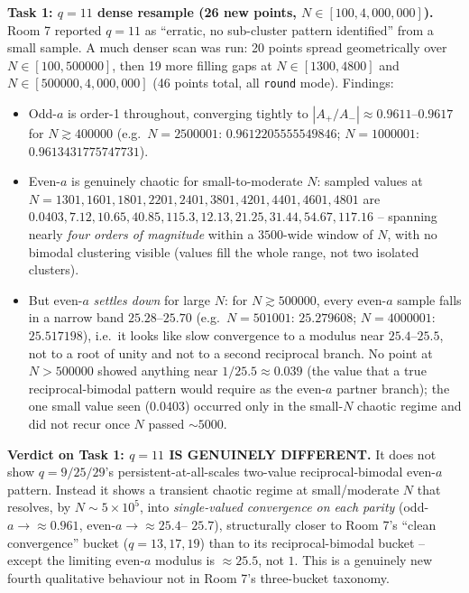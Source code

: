 \textbf{Task 1: $q=11$ dense resample (26 new points, $N\in[100,4{,}000{,}000]$).} Room 7 reported
$q=11$ as ``erratic, no sub-cluster pattern identified'' from a small sample. A much denser scan
was run: 20 points spread geometrically over $N\in[100,500000]$, then 19 more filling gaps at
$N\in[1300,4800]$ and $N\in[500000,4{,}000{,}000]$ (46 points total, all \texttt{round} mode).
Findings:
\begin{itemize}
\item Odd-$a$ is order-1 throughout, converging tightly to $|A_+/A_-|\approx0.9611$--$0.9617$ for
  $N\gtrsim400000$ (e.g.\ $N=2500001$: $0.9612205555549846$; $N=1000001$: $0.9613431775747731$).
\item Even-$a$ is genuinely chaotic for small-to-moderate $N$: sampled values at
  $N=1301,1601,1801,2201,2401,3801,4201,4401,4601,4801$ are $0.0403,7.12,10.65,40.85,115.3,
  12.13,21.25,31.44,54.67,117.16$ -- spanning nearly \emph{four orders of magnitude} within a
  $3500$-wide window of $N$, with no bimodal clustering visible (values fill the whole range, not
  two isolated clusters).
\item But even-$a$ \emph{settles down} for large $N$: for $N\gtrsim500000$, every even-$a$ sample
  falls in a narrow band $25.28$--$25.70$ (e.g.\ $N=501001$: $25.279608$; $N=4000001$:
  $25.517198$), i.e.\ it looks like slow convergence to a modulus near $25.4$--$25.5$, not to a
  root of unity and not to a second reciprocal branch. No point at $N>500000$ showed anything near
  $1/25.5\approx0.039$ (the value that a true reciprocal-bimodal pattern would require as the
  even-$a$ partner branch); the one small value seen ($0.0403$) occurred only in the
  small-$N$ chaotic regime and did not recur once $N$ passed $\sim5000$.
\end{itemize}
\textbf{Verdict on Task 1: $q=11$ IS GENUINELY DIFFERENT.} It does not show $q=9/25/29$'s
persistent-at-all-scales two-value reciprocal-bimodal even-$a$ pattern. Instead it shows a
transient chaotic regime at small/moderate $N$ that resolves, by $N\sim5\times10^5$, into
\emph{single-valued convergence on each parity} (odd-$a\to\approx0.961$, even-$a\to\approx25.4$--
$25.7$), structurally closer to Room 7's ``clean convergence'' bucket ($q=13,17,19$) than to its
reciprocal-bimodal bucket -- except the limiting even-$a$ modulus is $\approx25.5$, not $1$. This
is a genuinely new fourth qualitative behaviour not in Room 7's three-bucket taxonomy.

